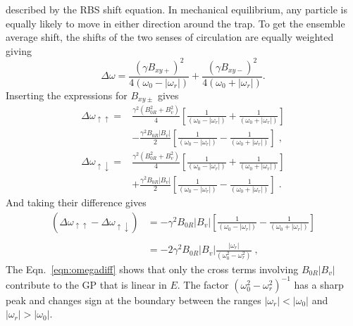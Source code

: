 described by the RBS shift equation.  In mechanical equilibrium, any
particle is equally likely to move in either direction around the
trap. To get the ensemble average shift, the shifts of the two senses
of circulation are equally weighted giving
%
\begin{equation}
\Delta \omega = \frac{(\gamma B_{xy+})^2}{4(\omega_0 - |\omega_r|)} + \frac{(\gamma B_{xy-})^2}{4(\omega_0 + |\omega_r|)} .
\end{equation}
%
Inserting the expressions for $B_{xy\pm}$ gives
%
\begin{equation}
\begin{split}
\Delta \omega_{\uparrow\uparrow} = & \frac{\gamma^2 (B_{0R}^2 + B_{v}^2)}{4} \left[ 
\frac{1}{(\omega_0 - |\omega_r|)} + \frac{1}{(\omega_0 + |\omega_r|)} \right] \\ & - \frac{\gamma^2 B_{0R} |B_v|}{2} \left[ 
\frac{1}{(\omega_0 - |\omega_r|)} - \frac{1}{(\omega_0 + |\omega_r|)} \right] \; ,
\end{split}
\end{equation}
%
\begin{equation}
\begin{split}
\Delta \omega_{\uparrow\downarrow} = & \frac{\gamma^2 (B_{0R}^2 + B_{v}^2)}{4} \left[ 
\frac{1}{(\omega_0 - |\omega_r|)} + \frac{1}{(\omega_0 + |\omega_r|)} \right] \\ & + \frac{\gamma^2 B_{0R} |B_v|}{2} \left[ 
\frac{1}{(\omega_0 - |\omega_r|)} - \frac{1}{(\omega_0 + |\omega_r|)} \right] \; .
\end{split}
\end{equation}
%
And taking their difference gives
%
\begin{equation}
\label{eqn:omegadiff}
\begin{split}
(\Delta \omega_{\uparrow\uparrow} - \Delta \omega_{\uparrow\downarrow}) & =   -\gamma^2 B_{0R} |B_{v}| \left[ \frac{1}{(\omega_0 - |\omega_r|)} - \frac{1}{(\omega_0 + |\omega_r|)} \right]
\\ \\ & = -2\gamma^2 B_{0R} |B_{v}|\frac{|\omega_r|}{(\omega_0^2 - \omega_r^2)}\; ,
\end{split}
\end{equation}
%
The Eqn.~\ref{eqn:omegadiff} shows that only the cross terms involving
$B_{0R}|B_v|$ contribute to the GP that is linear in $E$.  The factor
$(\omega_0^2 - \omega_r^2)^{-1}$ has a sharp peak and changes sign at
the boundary between the ranges $|\omega_r| < |\omega_0|$ and
$|\omega_r| > |\omega_0|$.

